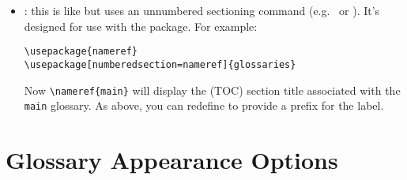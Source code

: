 \documentclass[report,inlinetitle]{nlctdoc}
\begin{document}
\begin{description}
\begin{itemize}
\item {}: this is like
 but uses an unnumbered
sectioning command (e.g.\  or ). It's
designed for use with the  package. For example:
\begin{verbatim}
\usepackage{nameref}
\usepackage[numberedsection=nameref]{glossaries}
\end{verbatim}
Now \verb|\nameref{main}| will display the (TOC) section title
associated with the \texttt{main} glossary. As above, you can
redefine  to provide a prefix for the label.
\end{itemize}

\end{description}

\section{Glossary Appearance Options}
\label{sec:pkgopts-printglos}
\end{document}
